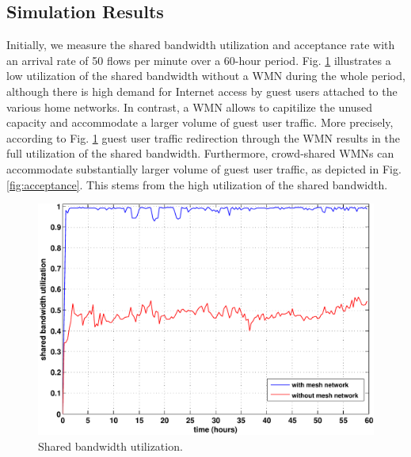 \subsection{Simulation Results}
\label{evaluation:results}

Initially, we measure the shared bandwidth utilization and acceptance rate with an arrival rate of 50 flows per minute over a 60-hour period. Fig. \ref{fig:utilization} illustrates a low utilization of the shared bandwidth without a WMN during the whole period, although there is high demand for Internet access by guest users attached to the various home networks. In contrast, a WMN allows to capitilize the unused capacity and accommodate a larger volume of guest user traffic. More precisely, according to Fig. \ref{fig:utilization} guest user traffic redirection through the WMN results in the full utilization of the shared bandwidth. Furthermore, crowd-shared WMNs can accommodate substantially larger volume of guest user traffic, as depicted in Fig. \ref{fig:acceptance}. This stems from the high utilization of the shared bandwidth.

\begin{figure}[t]
\begin{center}
\includegraphics[width=1\linewidth]{results/utilization.pdf}
\caption{Shared bandwidth utilization.}
\label{fig:utilization}
\end{center}
\end{figure}

